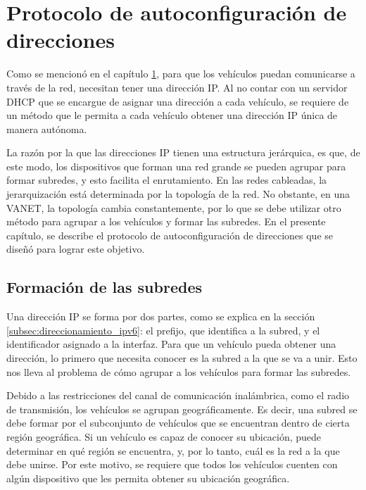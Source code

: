 ﻿%
\chapter{Protocolo de autoconfiguración de direcciones}

\label{ch:autoconfiguracion_de_direcciones}

Como se mencionó en el capítulo \ref{ch:autoconfiguracion_de_direcciones}, para
que los vehículos puedan comunicarse a través de la red, necesitan tener una
dirección IP. Al no contar con un servidor DHCP que se encargue de asignar una
dirección a cada vehículo, se requiere de un método que le permita a cada
vehículo obtener una dirección IP única de manera autónoma.

La razón por la que las direcciones IP tienen una estructura jerárquica, es que,
de este modo, los dispositivos que forman una red grande se pueden agrupar para
formar subredes, y esto facilita el enrutamiento. En las redes cableadas, la
jerarquización está determinada por la topología de la red. No obstante, en una
VANET, la topología cambia constantemente, por lo que se debe utilizar otro
método para agrupar a los vehículos y formar las subredes. En el presente
capítulo, se describe el protocolo de autoconfiguración de direcciones que se
diseñó para lograr este objetivo.

\section{Formación de las subredes}

\label{sec:formacion_de_subredes}

Una dirección IP se forma por dos partes, como se explica en la sección
\ref{subsec:direccionamiento_ipv6}: el prefijo, que identifica a la subred, y el
identificador asignado a la interfaz. Para que un vehículo pueda obtener una
dirección, lo primero que necesita conocer es la subred a la que se va a unir.
Esto nos lleva al problema de cómo agrupar a los vehículos para formar las
subredes.

Debido a las restricciones del canal de comunicación inalámbrica, como el
radio de transmisión, los vehículos se agrupan geográficamente. Es decir, una
subred se debe formar por el subconjunto de vehículos que se encuentran dentro
de cierta región geográfica. Si un vehículo es capaz de conocer su ubicación,
puede determinar en qué región se encuentra, y, por lo tanto, cuál es la red a
la que debe unirse. Por este motivo, se requiere que todos los vehículos
cuenten con algún dispositivo que les permita obtener su ubicación geográfica.

